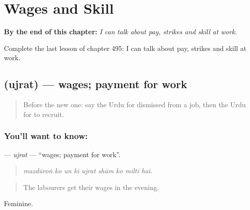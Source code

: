 
\chapter{Wages and Skill}
\label{ch:ur-wages-and-skill}

\begin{chapteropening}
\textbf{By the end of this chapter:} \emph{I can talk about pay, strikes and skill at work.}

Complete the last lesson of chapter 495: I can talk about pay, strikes and skill at work.
\end{chapteropening}

\section[\texorpdfstring{\ur{اجرت} (ujrat)}{اجرت (ujrat)}]{ (ujrat) — wages; payment for work}

\label{lesson:UR-C495-ujrat}



\begin{quote}
Before the new one: say the Urdu for dismissed from a job, then the Urdu for to recruit.
\end{quote}

\subsection*{You'll want to know: }
\textbf{} — \emph{ujrat} — \textquotedblleft{}wages; payment for work\textquotedblright{}.

\begin{quote}
        
\end{quote}

\begin{quote}
\emph{mazdūroṅ ko un kī ujrat shām ko miltī hai.}
\end{quote}

\begin{quote}
The labourers get their wages in the evening.
\end{quote}

Feminine.

